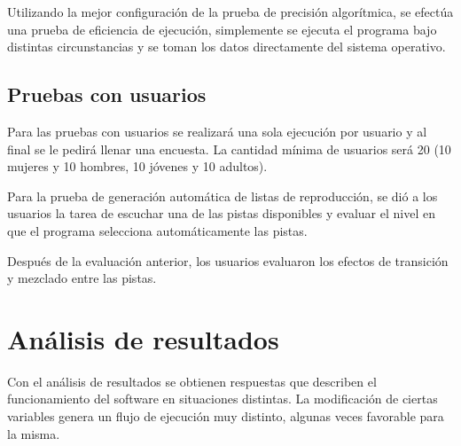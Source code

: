 \noindent Utilizando la mejor configuraci\'on de la prueba de precisi\'on algor\'itmica, se efect\'ua una prueba de eficiencia de ejecuci\'on, simplemente se ejecuta el programa bajo distintas circunstancias y se toman los datos directamente del sistema operativo.

\subsection{Pruebas con usuarios}
Para las pruebas con usuarios se realizar\'a una sola ejecuci\'on por usuario y al final se le pedir\'a llenar una encuesta. La cantidad m\'inima de usuarios ser\'a 20 (10 mujeres y 10 hombres, 10 j\'ovenes y 10 adultos).

\noindent Para la prueba de generaci\'on autom\'atica de listas de reproducci\'on, se di\'o a los usuarios la tarea de escuchar una de las pistas disponibles y evaluar el nivel en que el programa selecciona autom\'aticamente las pistas.

\noindent Despu\'es de la evaluaci\'on anterior, los usuarios evaluaron los efectos de transici\'on y mezclado entre las pistas.




\newpage





\newpage



%

\section{An\'alisis de resultados}

Con el an\'alisis de resultados se obtienen respuestas que describen el funcionamiento del software en situaciones distintas. La modificaci\'on de ciertas variables genera un flujo de ejecuci\'on muy distinto, algunas veces favorable para la misma.

